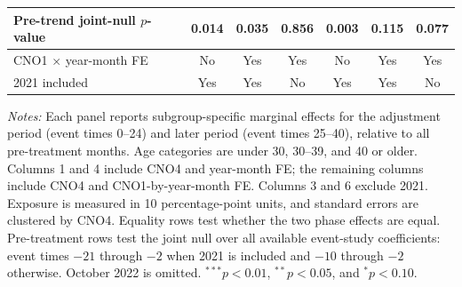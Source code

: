 \begin{table}[!t]
\begin{threeparttable}
\begin{tabular}{@{}lcccccc@{}}
Pre-trend joint-null $p$-value & 0.014 & 0.035 & 0.856 & 0.003 & 0.115 & 0.077 \\
\midrule
CNO1 $\times$ year-month FE & No & Yes & Yes & No & Yes & Yes \\
2021 included & Yes & Yes & No & Yes & Yes & No \\
\bottomrule
\end{tabular}
\begin{tablenotes}[flushleft]
\scriptsize
\item \emph{Notes:} Each panel reports subgroup-specific marginal effects for the adjustment period (event times 0--24) and later period (event times 25--40), relative to all pre-treatment months. Age categories are under 30, 30--39, and 40 or older. Columns 1 and 4 include CNO4 and year-month FE; the remaining columns include CNO4 and CNO1-by-year-month FE. Columns 3 and 6 exclude 2021. Exposure is measured in 10 percentage-point units, and standard errors are clustered by CNO4. Equality rows test whether the two phase effects are equal. Pre-treatment rows test the joint null over all available event-study coefficients: event times $-21$ through $-2$ when 2021 is included and $-10$ through $-2$ otherwise. October 2022 is omitted. $^{***}p<0.01$, $^{**}p<0.05$, and $^{*}p<0.10$.
\end{tablenotes}
\end{threeparttable}
\end{table}
